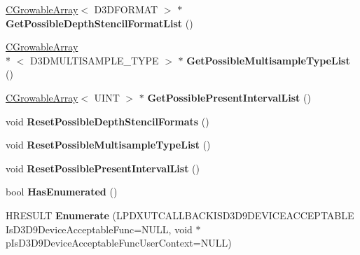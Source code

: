 \begin{DoxyCompactItemize}
\item 
\hypertarget{class_c_d3_d9_enumeration_a90b464f218bb5bf5f5f4bcb6e4e78705}{\hyperlink{class_c_growable_array}{C\+Growable\+Array}$<$ D3\+D\+F\+O\+R\+M\+A\+T $>$ $\ast$ {\bfseries Get\+Possible\+Depth\+Stencil\+Format\+List} ()}\label{class_c_d3_d9_enumeration_a90b464f218bb5bf5f5f4bcb6e4e78705}

\item 
\hypertarget{class_c_d3_d9_enumeration_acd4e1420930c60047da36321c7c88e62}{\hyperlink{class_c_growable_array}{C\+Growable\+Array}\\*
$<$ D3\+D\+M\+U\+L\+T\+I\+S\+A\+M\+P\+L\+E\+\_\+\+T\+Y\+P\+E $>$ $\ast$ {\bfseries Get\+Possible\+Multisample\+Type\+List} ()}\label{class_c_d3_d9_enumeration_acd4e1420930c60047da36321c7c88e62}

\item 
\hypertarget{class_c_d3_d9_enumeration_aaa2f2cd56f6d770357c96fe91f36c041}{\hyperlink{class_c_growable_array}{C\+Growable\+Array}$<$ U\+I\+N\+T $>$ $\ast$ {\bfseries Get\+Possible\+Present\+Interval\+List} ()}\label{class_c_d3_d9_enumeration_aaa2f2cd56f6d770357c96fe91f36c041}

\item 
\hypertarget{class_c_d3_d9_enumeration_af67dc2db8e4cb9597cd3b8fd27e67baa}{void {\bfseries Reset\+Possible\+Depth\+Stencil\+Formats} ()}\label{class_c_d3_d9_enumeration_af67dc2db8e4cb9597cd3b8fd27e67baa}

\item 
\hypertarget{class_c_d3_d9_enumeration_ad248a25a0c7a1cd8efe62b6e9f236c5f}{void {\bfseries Reset\+Possible\+Multisample\+Type\+List} ()}\label{class_c_d3_d9_enumeration_ad248a25a0c7a1cd8efe62b6e9f236c5f}

\item 
\hypertarget{class_c_d3_d9_enumeration_a8f5cfa65f5c1a5c3692270aa2b642546}{void {\bfseries Reset\+Possible\+Present\+Interval\+List} ()}\label{class_c_d3_d9_enumeration_a8f5cfa65f5c1a5c3692270aa2b642546}

\item 
\hypertarget{class_c_d3_d9_enumeration_a633d7b196f79f5e70b497b3d8f4fcef8}{bool {\bfseries Has\+Enumerated} ()}\label{class_c_d3_d9_enumeration_a633d7b196f79f5e70b497b3d8f4fcef8}

\item 
\hypertarget{class_c_d3_d9_enumeration_a1898f1f5ebd0fee2443ee89a60f38e1f}{H\+R\+E\+S\+U\+L\+T {\bfseries Enumerate} (L\+P\+D\+X\+U\+T\+C\+A\+L\+L\+B\+A\+C\+K\+I\+S\+D3\+D9\+D\+E\+V\+I\+C\+E\+A\+C\+C\+E\+P\+T\+A\+B\+L\+E Is\+D3\+D9\+Device\+Acceptable\+Func=N\+U\+L\+L, void $\ast$p\+Is\+D3\+D9\+Device\+Acceptable\+Func\+User\+Context=N\+U\+L\+L)}\label{class_c_d3_d9_enumeration_a1898f1f5ebd0fee2443ee89a60f38e1f}


\end{DoxyCompactItemize}
